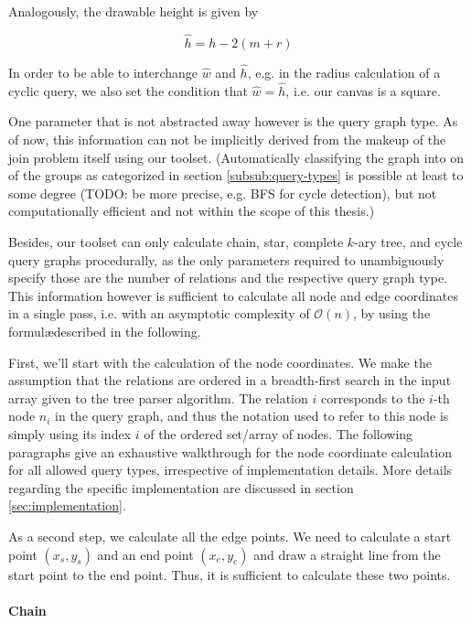 Analogously, the drawable height is given by

\begin{equation}\label{eqn:painting-h_hat}
    \hat{h} = h - 2(m + r)    
\end{equation}

In order to be able to interchange $\hat{w}$ and $\hat{h}$, e.g. in the radius calculation of a cyclic query, we also set the condition that $\hat{w} = \hat{h}$, i.e. our canvas is a square.

One parameter that is not abstracted away however is the query graph type. As of now, this information can not be implicitly derived from the makeup of the join problem itself using our toolset. 
(Automatically classifying the graph into on of the groups as categorized in section \ref{subsub:query-types} is possible at least to some degree (TODO: be more precise, e.g. BFS for cycle detection), but not computationally efficient and not within the scope of this thesis.)

Besides, our toolset can only calculate chain, star, complete $k$-ary tree, and cycle query graphs procedurally, as the only parameters required to unambiguously specify those are the number of relations and the respective query graph type. This information however is sufficient to calculate all node and edge coordinates in a single pass, i.e. with an asymptotic complexity of $\mathcal{O}(n)$, by using the formul\ae described in the following.


First, we'll start with the calculation of the node coordinates. We make the assumption that the relations are ordered in a breadth-first search in the input array given to the tree parser algorithm. The relation $i$ corresponds to the $i$-th node $n_i$ in the query graph, and thus the notation used to refer to this node is simply using its index $i$ of the ordered set/array of nodes. The following paragraphs give an exhaustive walkthrough for the node coordinate calculation for all allowed query types, irrespective of implementation details. More details regarding the specific implementation are discussed in section \ref{sec:implementation}.

As a second step, we calculate all the edge points. We need to calculate a start point $(x_s, y_s)$ and an end point $(x_e, y_e)$ and draw a straight line from the start point to the end point. Thus, it is sufficient to calculate these two points.

\paragraph{Chain} 

